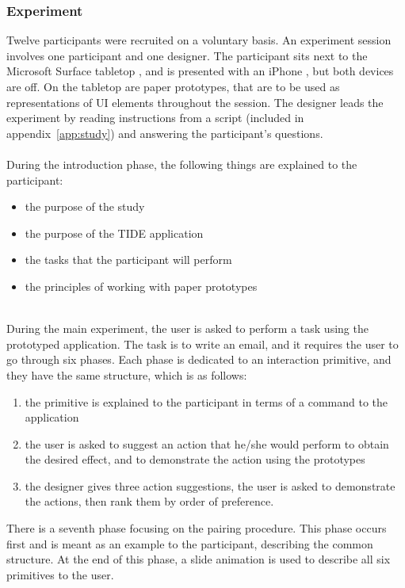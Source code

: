 \subsubsection{Experiment}

Twelve participants were recruited on a voluntary basis.
An experiment session involves one participant and one designer.
The participant sits next to the Microsoft Surface tabletop \citep{ms}, and is presented with an iPhone \citep{iphone}, but both devices are off.
On the tabletop are paper prototypes, that are to be used as representations of UI elements throughout the session.
The designer leads the experiment by reading instructions from a script (included in appendix~\ref{app:study}) and answering the participant's questions.
\hfill\\\\
During the introduction phase, the following things are explained to the participant:
\begin{itemize}
\item the purpose of the study
\item the purpose of the TIDE application
\item the tasks that the participant will perform
\item the principles of working with paper prototypes
\end{itemize}
\hfill\\
During the main experiment, the user is asked to perform a task using the prototyped application.
The task is to write an email, and it requires the user to go through six phases.
Each phase is dedicated to an interaction primitive, and they have the same structure, which is as follows:
\begin{enumerate}
\item the primitive is explained to the participant in terms of a command to the application
\item the user is asked to suggest an action that he/she would perform to obtain the desired effect, and to demonstrate the action using the prototypes
\item the designer gives three action suggestions, the user is asked to demonstrate the actions, then rank them by order of preference.
\end{enumerate}

There is a seventh phase focusing on the pairing procedure.
This phase occurs first and is meant as an example to the participant, describing the common structure.
At the end of this phase, a slide animation is used to describe all six primitives to the user.

